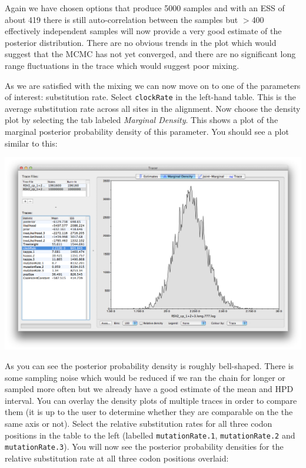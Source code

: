 \documentclass[12pt]{article}
\begin{document}
\medskip{}

Again we have chosen options that produce 5000 samples and with an ESS of about 419 there is still auto-correlation
between the samples but $>$400 effectively independent samples will now provide a very good estimate of the posterior distribution.
There are no obvious trends in the plot which would suggest that the MCMC has not yet converged, and there are no significant long range 
fluctuations in the trace which would suggest poor mixing.

As we are satisfied with the mixing we can now move on to one of the parameters of interest:
substitution rate. Select \texttt{clockRate} in the left-hand table. This is the average substitution rate across all sites in the
alignment. Now choose the density plot by selecting the tab labeled {\it Marginal Density}. This shows a plot of the marginal posterior probability
density of this parameter. You should see a plot similar to this:

\medskip{}

\includegraphics[width=\textwidth]{figures/Tracer_density}

\medskip{}

As you can see the posterior probability density is roughly bell-shaped. There is some sampling noise which would be
reduced if we ran the chain for longer or sampled more often but we already have a good estimate of the mean and HPD interval. You can overlay
the density plots of multiple traces in order to compare them (it is up to the user to determine whether they are comparable on the the same axis or not). Select the relative substitution rates for all three codon positions in the table to the left (labelled
\texttt{mutationRate.1}, \texttt{mutationRate.2} and \texttt{mutationRate.3}). You will now see the posterior probability densities for the relative
substitution rate at all three codon positions overlaid:
\end{document}
